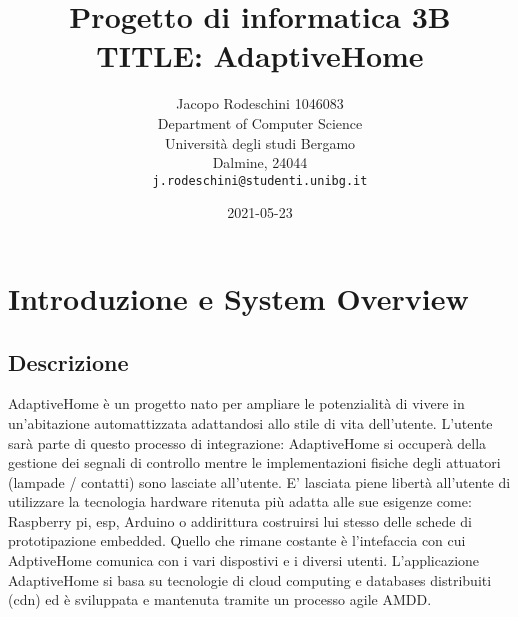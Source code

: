 \documentclass[onecolumn,a4paper]{article}
\author{Jacopo Rodeschini 1046083 \\ Department of Computer Science \\ Università degli studi Bergamo \\ Dalmine, 24044 \\ \texttt{j.rodeschini@studenti.unibg.it}}
\date{2021-05-23}
\title{Progetto di informatica 3B \\ TITLE: AdaptiveHome}
\begin{document}
\maketitle
\tableofcontents

\clearpage
\large

\listoffigures
\listoftables


\section{Introduzione e System Overview}
\label{sec:org8ceda5b}

\subsection{Descrizione}
\label{sec:orgad32e28}
   AdaptiveHome è un progetto nato per ampliare le potenzialità di vivere in un'abitazione automattizzata adattandosi allo stile di vita dell'utente. L'utente sarà parte di questo processo di integrazione: AdaptiveHome si occuperà della gestione dei segnali di controllo mentre le implementazioni fisiche degli attuatori (lampade / contatti) sono lasciate all'utente. E' lasciata piene libertà all'utente di utilizzare la tecnologia hardware ritenuta più adatta alle sue esigenze come: Raspberry pi, esp, Arduino o addirittura costruirsi lui stesso delle schede di prototipazione embedded. Quello che rimane costante è l'intefaccia con cui AdptiveHome comunica con i vari dispostivi e i diversi utenti. L'applicazione AdaptiveHome si basa su tecnologie di cloud computing e databases distribuiti (cdn) ed è sviluppata e mantenuta tramite un processo agile AMDD.
\end{document}
